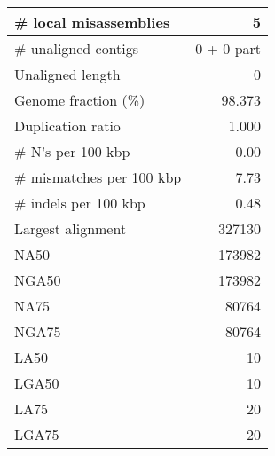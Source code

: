 \documentclass[12pt,a4paper]{article}
\begin{document}
\begin{table}[ht]
\begin{center}
\begin{tabular}{|l*{1}{|r}|}
\# local misassemblies & 5 \\ \hline
\# unaligned contigs & 0 + 0 part \\ \hline
Unaligned length & 0 \\ \hline
Genome fraction (\%) & 98.373 \\ \hline
Duplication ratio & 1.000 \\ \hline
\# N's per 100 kbp & 0.00 \\ \hline
\# mismatches per 100 kbp & 7.73 \\ \hline
\# indels per 100 kbp & 0.48 \\ \hline
Largest alignment & 327130 \\ \hline
NA50 & 173982 \\ \hline
NGA50 & 173982 \\ \hline
NA75 & 80764 \\ \hline
NGA75 & 80764 \\ \hline
LA50 & 10 \\ \hline
LGA50 & 10 \\ \hline
LA75 & 20 \\ \hline
LGA75 & 20 \\ \hline
\end{tabular}
\end{center}
\end{table}
\end{document}
